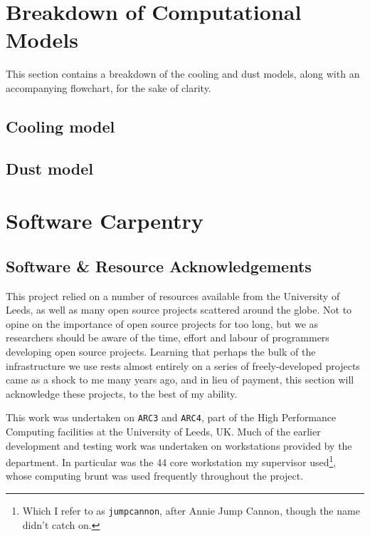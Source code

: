 
\chapter{Breakdown of Computational Models}

This section contains a breakdown of the cooling and dust models, along with an accompanying flowchart, for the sake of clarity.

\section{Cooling model}

\section{Dust model}

\chapter{Software Carpentry}

\section{Software \& Resource Acknowledgements}

This project relied on a number of resources available from the University of Leeds, as well as many open source projects scattered around the globe.
Not to opine on the importance of open source projects for too long, but we as researchers should be aware of the time, effort and labour of programmers developing open source projects.
Learning that perhaps the bulk of the infrastructure we use rests almost entirely on a series of freely-developed projects came as a shock to me many years ago, and in lieu of payment, this section will acknowledge these projects, to the best of my ability.

This work was undertaken on \texttt{ARC3} and \texttt{ARC4}, part of the High Performance Computing facilities at the University of Leeds, UK.
Much of the earlier development and testing work was undertaken on workstations provided by the department.
In particular was the 44 core workstation my supervisor used\footnote{Which I refer to as \texttt{jumpcannon}, after Annie Jump Cannon, though the name didn't catch on.}, whose computing brunt was used frequently throughout the project.

